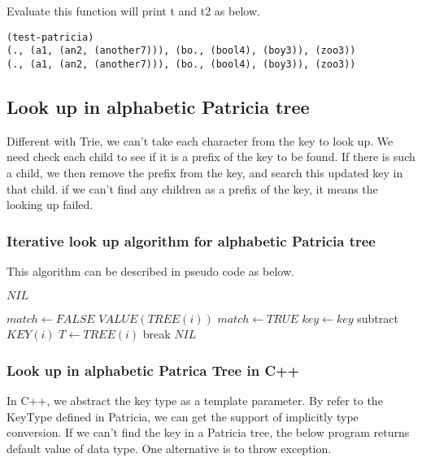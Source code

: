\documentclass{article}
\begin{document}
Evaluate this function will print t and t2 as below.

\begin{lstlisting}
(test-patricia)
(., (a1, (an2, (another7))), (bo., (bool4), (boy3)), (zoo3))
(., (a1, (an2, (another7))), (bo., (bool4), (boy3)), (zoo3))
\end{lstlisting}

\subsection{Look up in alphabetic Patricia tree}
Different with Trie, we can't take each character from the key to look up.
We need check each child to see if it is a prefix of the key to be found.
If there is such a child, we then remove the prefix from
the key, and search this updated key in that child. if we can't find any
children as a prefix of the key, it means the looking up failed.

\subsubsection{Iterative look up algorithm for alphabetic Patricia tree}

This algorithm can be described in pseudo code as below.
\begin{algorithmic}[1]
     \State \Return $NIL$ \EndIf

  \Repeat
    \State $match \leftarrow FALSE$
        \State \Return $VALUE(TREE(i))$
      \EndIf
        \State $match \leftarrow TRUE$
        \State $key \leftarrow key$ subtract $KEY(i)$
        \State $T \leftarrow TREE(i)$
        \State break
      \EndIf
    \EndFor
  \State \Return $NIL$
\EndFunction
\end{algorithmic}

\subsubsection*{Look up in alphabetic Patrica Tree in C++}
In C++, we abstract the key type as a template parameter. By refer to
the KeyType defined in Patricia, we can get the support of implicitly
type conversion. If we can't find the key in a Patricia tree, the
below program returns default value of data type. One alternative is
to throw exception.
\end{document}

